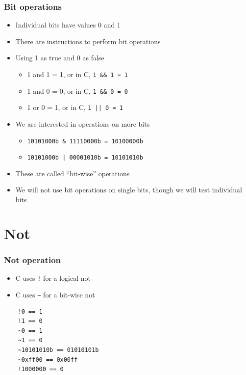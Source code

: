 \documentclass{beamer}
\begin{document}
\begin{frame}
    \frametitle{Bit operations}
    \begin{itemize}
        \item Individual bits have values 0 and 1
        \item There are instructions to perform bit operations
        \item Using 1 as true and 0 as false
        \begin{itemize}
            \item 1 and 1 = 1, or in C, {\tt 1 \&\& 1 = 1}
            \item 1 and 0 = 0, or in C, {\tt 1 \&\& 0 = 0}
            \item 1 or 0 = 1, or in C, {\tt 1 || 0 = 1}
        \end{itemize}
        \item We are interested in operations on more bits
        \begin{itemize}
            \item {\tt 10101000b \& 11110000b = 10100000b}
            \item {\tt 10101000b | 00001010b = 10101010b}
        \end{itemize}
        \item These are called ``bit-wise'' operations
        \item We will not use bit operations on single bits, though we
              will test individual bits
    \end{itemize}
\end{frame}

\section{Not}

\begin{frame}[fragile]
    \frametitle{Not operation}
    \begin{itemize}
        \item C uses {\tt !} for a logical not
        \item C uses {\tt \~{}} for a bit-wise not
    \end{itemize}
\begin{verbatim}
    !0 == 1
    !1 == 0
    ~0 == 1
    ~1 == 0
    ~10101010b == 01010101b
    ~0xff00 == 0x00ff
    !1000000 == 0
\end{verbatim}   
\end{frame}
\end{document}
